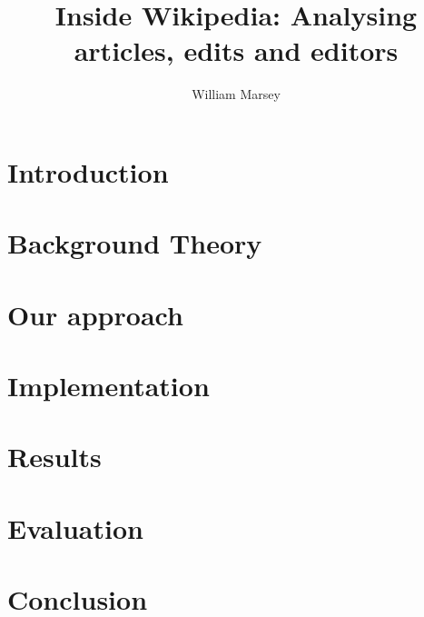 \documentclass[a4paper,11pt,twoside]{report}
\begin{document}
\title{\LARGE {\bf Inside Wikipedia: Analysing articles, edits and editors}\\
 \vspace*{6mm}
}

\author{William Marsey}

\normallinespacing
\maketitle

\preface



\body
\chapter{Introduction}
\label{ch:introduction}


\chapter{Background Theory}
\label{ch:background}




\chapter{Our approach}



\chapter{Implementation}
\label{ch:implementation}




\chapter{Results}
\label{ch:results}




\chapter{Evaluation}
\label{ch:evaluation}




\chapter{Conclusion}
\label{ch:conclusions}




\appendix

\printbibliography        
\end{document}
